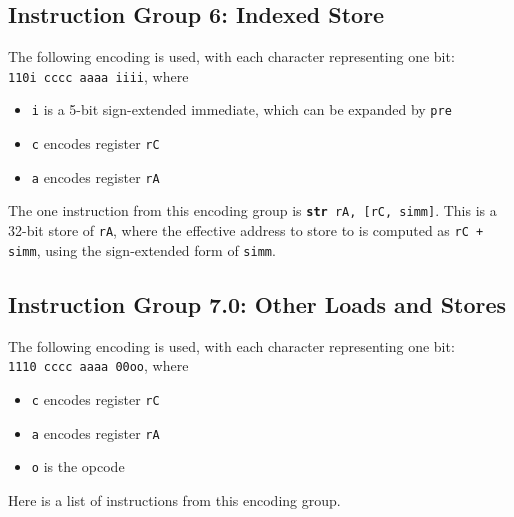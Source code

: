 \documentclass{article}
\begin{document}
	\subsection{Instruction Group 6:  Indexed Store}
	The following encoding is used, with each character representing one
	bit:  \\
	\texttt{110i cccc aaaa iiii}, where

	\singlespacing
	\begin{itemize}
		\item \texttt{i} is a 5-bit sign-extended immediate, which can
		be expanded by \texttt{pre}  
		\item \texttt{c} encodes register \texttt{rC}
		\item \texttt{a} encodes register \texttt{rA}
	\end{itemize}
	\doublespacing

	The one instruction from this encoding group is
	\texttt{\textbf{str} rA, [rC, simm]}.
	This is a 32-bit store of \texttt{rA}, where the effective address to
	store to is computed as \texttt{rC + simm}, using the sign-extended
	form of \texttt{simm}.

	\subsection{Instruction Group 7.0:  Other Loads and Stores}
	The following encoding is used, with each character representing one
	bit:  \\
	\texttt{1110 cccc aaaa 00oo}, where

	\singlespacing
	\begin{itemize}
		\item \texttt{c} encodes register \texttt{rC}
		\item \texttt{a} encodes register \texttt{rA}
		\item \texttt{o} is the opcode
	\end{itemize}
	\doublespacing

	Here is a list of instructions from this encoding group.
\end{document}
